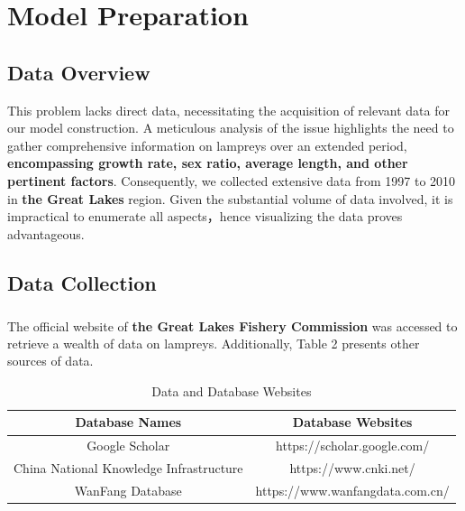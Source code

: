 \documentclass[12pt]{article}  %
\newcommand{\upcite}[1]{\textsuperscript{\textsuperscript{\cite{#1}}}}
\begin{document}
\vspace{-1.5cm}%

\section{Model Preparation}
\subsection{Data Overview}
This problem lacks direct data, necessitating the acquisition of relevant data for our model construction.   A meticulous analysis of the issue highlights the need to gather comprehensive information on lampreys over an extended period, \textbf{encompassing growth rate, sex ratio, average length, and other pertinent factors}.   Consequently, we collected extensive data from 1997 to 2010 in \textbf{the Great Lakes }region.   Given the substantial volume of data involved, it is impractical to enumerate all aspects，hence visualizing the data proves advantageous.

\subsection{Data Collection}
The official website of \textbf{the Great Lakes Fishery Commission }\upcite{1}was accessed to retrieve a wealth of data on lampreys. Additionally, Table 2 presents other sources of data.

\begin{table}[htbp]
\begin{center}
\caption{Data and Database Websites}
\resizebox{\textwidth}{!}
{\begin{tabular}{c c}
\toprule[2pt]
\multicolumn{1}{m{5cm}}{\centering \textbf{Database Names}}
&\multicolumn{1}{m{10cm}}{\centering \textbf{Database Websites} }\\ %
\midrule
Google Scholar & https://scholar.google.com/ \\
China National Knowledge Infrastructure& https://www.cnki.net/\\
WanFang Database& https://www.wanfangdata.com.cn/\\
\bottomrule[2pt]
\end{tabular}}
\end{center}
\end{table}
\vspace{-0.5cm}
\end{document}
